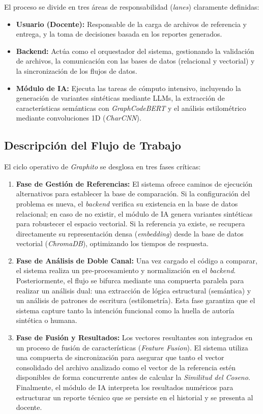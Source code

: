 El proceso se divide en tres áreas de responsabilidad (\textit{lanes}) claramente definidas:

\begin{itemize}
	\item \textbf{Usuario (Docente):} Responsable de la carga de archivos de referencia y entrega, y la toma de decisiones basada en los reportes generados.
	\item \textbf{Backend:} Actúa como el orquestador del sistema, gestionando la validación de archivos, la comunicación con las bases de datos (relacional y vectorial) y la sincronización de los flujos de datos.
	\item \textbf{Módulo de IA:} Ejecuta las tareas de cómputo intensivo, incluyendo la generación de variantes sintéticas mediante LLMs, la extracción de características semánticas con \textit{GraphCodeBERT} y el análisis estilométrico mediante convoluciones 1D (\textit{CharCNN}).
\end{itemize}

\subsection{Descripción del Flujo de Trabajo}

El ciclo operativo de \textit{Graphito} se desglosa en tres fases críticas:

\begin{enumerate}
	\item \textbf{Fase de Gestión de Referencias:} El sistema ofrece caminos de ejecución alternativos para establecer la base de comparación. Si la configuración del problema es nueva, el \textit{backend} verifica su existencia en la base de datos relacional; en caso de no existir, el módulo de IA genera variantes sintéticas para robustecer el espacio vectorial. Si la referencia ya existe, se recupera directamente su representación densa (\textit{embedding}) desde la base de datos vectorial (\textit{ChromaDB}), optimizando los tiempos de respuesta.

	\item \textbf{Fase de Análisis de Doble Canal:} Una vez cargado el código a comparar, el sistema realiza un pre-procesamiento y normalización en el \textit{backend}. Posteriormente, el flujo se bifurca mediante una compuerta paralela para realizar un análisis dual: una extracción de lógica estructural (semántica) y un análisis de patrones de escritura (estilometría). Esta fase garantiza que el sistema capture tanto la intención funcional como la huella de autoría sintética o humana.

	\item \textbf{Fase de Fusión y Resultados:} Los vectores resultantes son integrados en un proceso de fusión de características (\textit{Feature Fusion}). El sistema utiliza una compuerta de sincronización para asegurar que tanto el vector consolidado del archivo analizado como el vector de la referencia estén disponibles de forma concurrente antes de calcular la \textit{Similitud del Coseno}. Finalmente, el módulo de IA interpreta los resultados numéricos para estructurar un reporte técnico que se persiste en el historial y se presenta al docente.
\end{enumerate}

